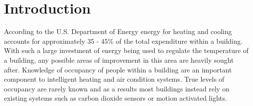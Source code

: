 \documentclass{acm_proc_article-sp}
\begin{document}
\date{17 May 2013}


\maketitle
\begin{abstract}
This paper provides a sample of a \LaTeX\ document which conforms to
the formatting guidelines for ACM SIG Proceedings.
It complements the document \textit{Author's Guide to Preparing
ACM SIG Proceedings Using \LaTeX$2_\epsilon$\ and Bib\TeX}. This
source file has been written with the intention of being
compiled under \LaTeX$2_\epsilon$\ and BibTeX.

The developers have tried to include every imaginable sort
of ``bells and whistles", such as a subtitle, footnotes on
title, subtitle and authors, as well as in the text, and
every optional component (e.g. Acknowledgments, Additional
Authors, Appendices), not to mention examples of
equations, theorems, tables and figures.

To make best use of this sample document, run it through \LaTeX\
and BibTeX, and compare this source code with the printed
output produced by the dvi file.
\end{abstract}




\section{Introduction}

According to the U.S. Department of Energy energy for heating and cooling accounts for approximately 35 - 45\% \cite{DOE2010} of the total expenditure within a building. With such a large investment of energy being used to regulate the temperature of a building, any possible areas of improvement in this area are heavily sought after.   Knowledge of occupancy of people within a building are an important component to intelligent heating and air condition systems.  True levels of occupancy are rarely known and as a results most buildings instead rely on existing systems such as carbon dioxide sensors or motion activated lights.  
\end{document}
